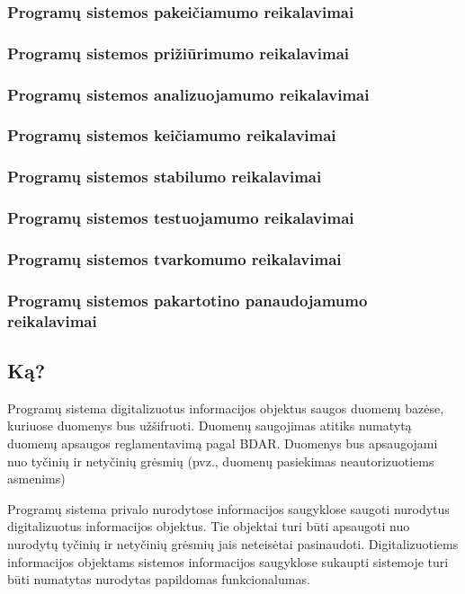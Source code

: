 \documentclass{VUMIFPSkursinis}
\begin{document}
	\subsubsection{Programų sistemos pakeičiamumo reikalavimai}
	\subsubsection{Programų sistemos prižiūrimumo reikalavimai}
	\subsubsection{Programų sistemos analizuojamumo reikalavimai}
	\subsubsection{Programų sistemos keičiamumo reikalavimai}
	\subsubsection{Programų sistemos stabilumo reikalavimai}
	\subsubsection{Programų sistemos testuojamumo reikalavimai}
	\subsubsection{Programų sistemos tvarkomumo reikalavimai}
	\subsubsection{Programų sistemos pakartotino panaudojamumo reikalavimai}

\subsection{Ką?}\label{sec:PSReqWhat}
Programų sistema digitalizuotus informacijos objektus saugos duomenų bazėse, kuriuose duomenys bus užšifruoti. Duomenų saugojimas atitiks numatytą duomenų apsaugos reglamentavimą pagal BDAR. Duomenys bus apsaugojami nuo tyčinių ir netyčinių grėsmių (pvz., duomenų pasiekimas neautorizuotiems asmenims)

Programų sistema privalo nurodytose informacijos saugyklose saugoti
nurodytus digitalizuotus informacijos objektus. Tie objektai turi būti apsaugoti
nuo nurodytų tyčinių ir netyčinių grėsmių jais neteisėtai pasinaudoti.
Digitalizuotiems informacijos objektams sistemos informacijos saugyklose
sukaupti sistemoje turi būti numatytas nurodytas papildomas
funkcionalumas.
\end{document}
